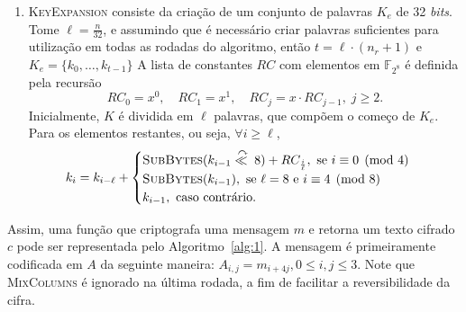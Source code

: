 \documentclass{ufsctex/ufsctex}
\begin{document}
\begin{enumerate}[label=\roman*.]
  \item \textsc{KeyExpansion} consiste da criação de um conjunto de palavras
      $K_e$ de 32 \emph{bits}.  Tome $\ell = \frac{n}{32}$, e assumindo que é
        necessário criar palavras suficientes para utilização em todas as
        rodadas do algoritmo, então $t = \ell \cdot (n_r + 1)$ e $K_e = \{k_0,
        \dots, k_{t - 1}\}$ A lista de constantes $RC$ com elementos em
        $\mathbb{F}_{2^{8}}$ é definida pela recursão
        \begin{equation}
          RC_0 = x^0, \quad RC_1 = x^1, \quad
          RC_j = x \cdot RC_{j-1}, \; j \geq 2.
        \end{equation}
        Inicialmente, $K$ é dividida em $\ell$ palavras, que compõem o começo
        de $K_e$. Para os elementos restantes, ou seja, $\forall i \geq \ell$,
        \begin{equation}
          k_{i} = k_{i - \ell} +
          \begin{cases}
            \textsc{SubBytes}(k_{i - 1}
              \stackrel{\curvearrowright}{\ll{}} 8) + RC_{\frac{i}{\ell}},
              \text{ se } i \equiv 0 \pmod{4} \\
            \textsc{SubBytes}(k_{i - 1}),
              \text{ se } \ell = 8 \text { e } i \equiv 4 \pmod{8} \\
            k_{i - 1}, \text{ caso contrário.}
          \end{cases}
        \end{equation}

\end{enumerate}

Assim, uma função que criptografa uma mensagem $m$ e retorna um texto cifrado
$c$ pode ser representada pelo Algoritmo~\ref{alg:1}. A mensagem é
primeiramente codificada em $A$ da seguinte maneira: $A_{i, j} = m_{i + 4j}, 0
\leq i, j \leq 3$.  Note que \textsc{MixColumns} é ignorado na última rodada, a
fim de facilitar a reversibilidade da cifra.
\end{document}
